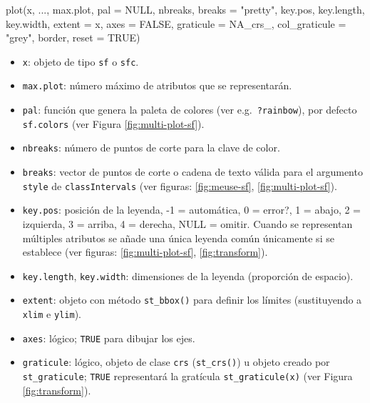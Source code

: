\documentclass[
  spanish,
]{book}
\newenvironment{Shaded}{\begin{snugshade}}{\end{snugshade}}
\newcommand{\AttributeTok}[1]{\textcolor[rgb]{0.77,0.63,0.00}{#1}}
\newcommand{\ConstantTok}[1]{\textcolor[rgb]{0.00,0.00,0.00}{#1}}
\newcommand{\FunctionTok}[1]{\textcolor[rgb]{0.00,0.00,0.00}{#1}}
\newcommand{\NormalTok}[1]{#1}
\newcommand{\StringTok}[1]{\textcolor[rgb]{0.31,0.60,0.02}{#1}}
\providecommand{\tightlist}{%
  \setlength{\itemsep}{0pt}\setlength{\parskip}{0pt}}
\theoremstyle{break}
\begin{document}
\begin{Shaded}
\begin{Highlighting}[]
\FunctionTok{plot}\NormalTok{(x, ..., max.plot, }\AttributeTok{pal =} \ConstantTok{NULL}\NormalTok{, nbreaks, }\AttributeTok{breaks =} \StringTok{"pretty"}\NormalTok{, }
\NormalTok{     key.pos, key.length, key.width, }\AttributeTok{extent =}\NormalTok{ x, }\AttributeTok{axes =} \ConstantTok{FALSE}\NormalTok{, }
     \AttributeTok{graticule =}\NormalTok{ NA\_crs\_, }\AttributeTok{col\_graticule =} \StringTok{"grey"}\NormalTok{, border, }\AttributeTok{reset =} \ConstantTok{TRUE}\NormalTok{)}
\end{Highlighting}
\end{Shaded}

\begin{itemize}
\tightlist
\item
  \texttt{x}: objeto de tipo \texttt{sf} o \texttt{sfc}.
\item
  \texttt{max.plot}: número máximo de atributos que se representarán.
\item
  \texttt{pal}: función que genera la paleta de colores (ver e.g.~\texttt{?rainbow}), por defecto \texttt{sf.colors} (ver Figura \ref{fig:multi-plot-sf}).
\item
  \texttt{nbreaks}: número de puntos de corte para la clave de color.
\item
  \texttt{breaks}: vector de puntos de corte o cadena de texto válida para el argumento \texttt{style} de \texttt{classIntervals} (ver figuras: \ref{fig:meuse-sf}, \ref{fig:multi-plot-sf}).
\item
  \texttt{key.pos}: posición de la leyenda, -1 = automática, 0 = error?, 1 = abajo, 2 = izquierda, 3 = arriba, 4 = derecha, NULL = omitir. Cuando se representan múltiples atributos se añade una única leyenda común únicamente si se establece (ver figuras: \ref{fig:multi-plot-sf}, \ref{fig:transform}).
\item
  \texttt{key.length}, \texttt{key.width}: dimensiones de la leyenda (proporción de espacio).
\item
  \texttt{extent}: objeto con método \texttt{st\_bbox()} para definir los límites (sustituyendo a \texttt{xlim} e \texttt{ylim}).
\item
  \texttt{axes}: lógico; \texttt{TRUE} para dibujar los ejes.
\item
  \texttt{graticule}: lógico, objeto de clase \texttt{crs} (\texttt{st\_crs()}) u objeto creado por \texttt{st\_graticule}; \texttt{TRUE} representará la gratícula \texttt{st\_graticule(x)} (ver Figura \ref{fig:transform}).

\end{itemize}
\end{document}
